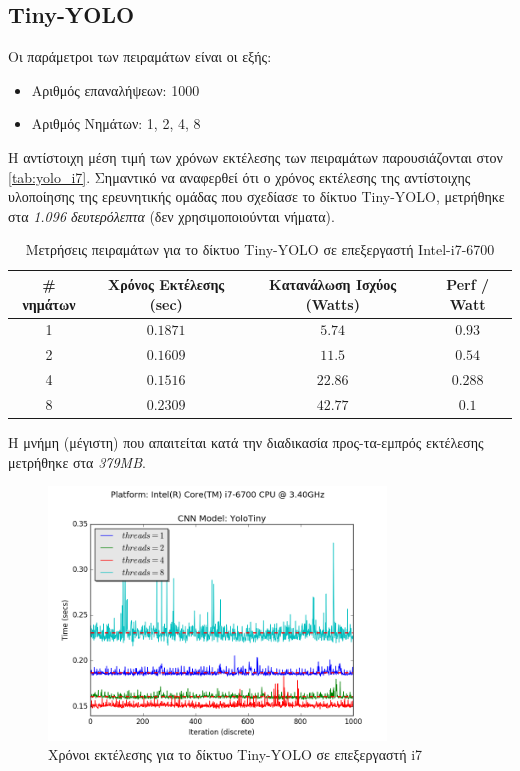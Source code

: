 
\subsection{Tiny-YOLO}

Οι παράμετροι των πειραμάτων είναι οι εξής:
\begin{itemize}
  \item{Αριθμός επαναλήψεων: 1000}
  \item{Αριθμός Νημάτων: 1, 2, 4, 8}
\end{itemize}

Η αντίστοιχη μέση τιμή των χρόνων εκτέλεσης των πειραμάτων παρουσιάζονται στον \autoref{tab:yolo_i7}.
Σημαντικό να αναφερθεί ότι ο χρόνος εκτέλεσης της αντίστοιχης υλοποίησης της ερευνητικής ομάδας
που σχεδίασε το δίκτυο Tiny-YOLO, μετρήθηκε στα \emph{1.096 δευτερόλεπτα} (δεν χρησιμοποιούνται νήματα).

\begin{table}[H]
  \begin{center}
    \caption{Μετρήσεις πειραμάτων για το δίκτυο Tiny-YOLO σε επεξεργαστή Intel-i7-6700}
    \label{tab:yolo_i7}
    \begin{tabular}{ | c | c | c | c | }
      \hline
      \rowcolor{Gray}
      \# νημάτων & Χρόνος Εκτέλεσης (sec) & Κατανάλωση Ισχύος (Watts) & Perf / Watt \\
      \hline
      1 & $0.1871$ & $5.74$ & $0.93$ \\
      2 & $0.1609$ & $11.5$ & $0.54$ \\
      4 & $0.1516$ & $22.86$ & $0.288$ \\
      8 & $0.2309$ & $42.77$ & $0.1$ \\
      \hline
    \end{tabular}
  \end{center}
\end{table}
Η μνήμη (μέγιστη) που απαιτείται κατά την διαδικασία
προς-τα-εμπρός εκτέλεσης μετρήθηκε στα \emph{379MB}.

\begin{figure}[H]
  \centering
  \includegraphics[width=0.8\textwidth]{./images/chapter6/benchmark_yolotiny_i7.png}
  \caption[Χρόνoι εκτέλεσης για το δίκτυο Tiny-YOLO σε επεξεργαστή i7]{Χρόνοι εκτέλεσης για το δίκτυο Tiny-YOLO σε επεξεργαστή i7}
  \label{fig:yolotiny_results_i7}
\end{figure}


